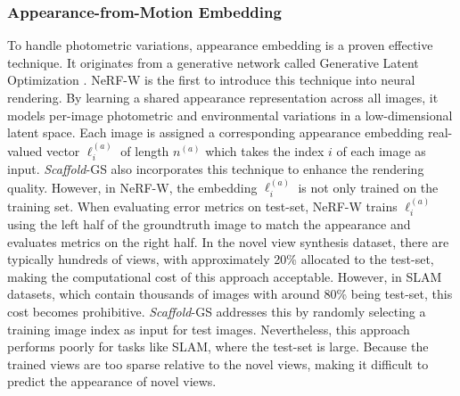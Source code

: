 \subsubsection{Appearance-from-Motion Embedding}
To handle photometric variations, appearance embedding is a proven effective technique. It originates from a generative network called Generative Latent Optimization \cite{GLO2019}. NeRF-W \cite{NeRF-W2021} is the first to introduce this technique into neural rendering. By learning a shared appearance representation across all images, it models per-image photometric and environmental variations in a low-dimensional latent space. Each image is assigned a corresponding appearance embedding real-valued vector $\bm{\ell}^{(a)}_i$ of length $n^{(a)}$ which takes the index $i$ of each image as input.  \textit{Scaffold}-GS \cite{Scaffold-GS2024} also incorporates this technique to enhance the rendering quality. However, in NeRF-W, the embedding $\bm{\ell}^{(a)}_i$ is not only trained on the training set. When evaluating error metrics on test-set, NeRF-W trains $\bm{\ell}^{(a)}_i$ using the left half of the groundtruth image to match the appearance and evaluates metrics on the right half. In the novel view synthesis dataset, there are typically hundreds of views, with approximately 20\% allocated to the test-set, making the computational cost of this approach acceptable. However, in SLAM datasets, which contain thousands of images with around 80\% being test-set, this cost becomes prohibitive. \textit{Scaffold}-GS addresses this by randomly selecting a training image index as input for test images. Nevertheless, this approach performs poorly for tasks like SLAM, where the test-set is large. Because the trained views are too sparse relative to the novel views, making it difficult to predict the appearance of novel views.

